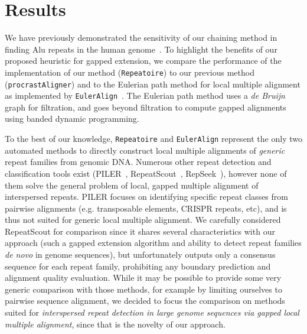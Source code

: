 \documentclass[9.5pt,journal,final,finalsubmission,twocolumn]{IEEEtran}
\begin{document}
\section{Results}
We have previously demonstrated the sensitivity of our chaining method
in finding Alu repeats in the human
genome~\cite{ref-procrast}. To highlight the benefits of our proposed
heuristic for gapped extension, we compare the performance of the implementation of our method (\texttt{Repeatoire}) to our previous method (\texttt{procrastAligner}) and to the Eulerian path method for local multiple alignment
as implemented by \texttt{EulerAlign}~\cite{ref-related1}. The Eulerian
path method uses a \textit{de Bruijn} graph for filtration, and goes
beyond filtration to compute gapped alignments using banded dynamic
programming.

To the best of our knowledge, \texttt{Repeatoire} and
\texttt{EulerAlign} represent the only two automated methods to directly
construct local multiple alignments of \emph{generic} repeat families from genomic DNA.
Numerous other repeat detection and classification tools exist (PILER~\cite{ref-piler}, RepeatScout~\cite{repeatscout}, RepSeek~\cite{repseek}), however none of them solve the general problem of local, gapped multiple alignment of interspersed repeats.  PILER focuses on identifying specific repeat classes from pairwise alignments (e.g. transposable elements, CRISPR repeats, etc), and is thus not suited for generic local multiple alignment. We carefully considered RepeatScout for comparison since it shares several characteristics with our approach (such a gapped extension algorithm and ability to detect repeat families \emph{de novo} in genome sequences), but unfortunately outputs only a consensus sequence for each repeat family, prohibiting any boundary prediction and alignment quality evaluation.  While it may be possible to provide some very generic comparison with those methods, for example by limiting ourselves to pairwise sequence alignment, we decided to focus the comparison on methods suited for \emph{interspersed repeat detection in large genome sequences via gapped local multiple alignment}, since that is the novelty of our approach.
\end{document}
